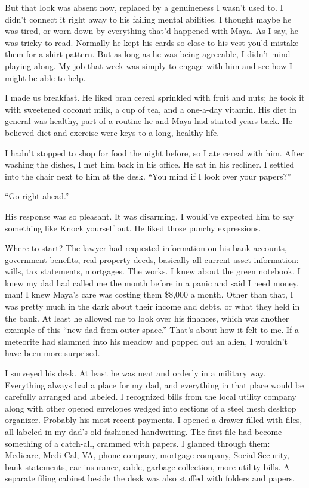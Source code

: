 \documentclass[12pt]{book}
\begin{document}
But that look was absent now, replaced by a genuineness I wasn't used to. I didn't connect it right away to his failing mental abilities. I thought maybe he was tired, or worn down by everything that'd happened with Maya. As I say, he was tricky to read. Normally he kept his cards so close to his vest you'd mistake them for a shirt pattern. But as long as he was being agreeable, I didn't mind playing along. My job that week was simply to engage with him and see how I might be able to help.

I made us breakfast. He liked bran cereal sprinkled with fruit and nuts; he took it with sweetened coconut milk, a cup of tea, and a one-a-day vitamin. His diet in general was healthy, part of a routine he and Maya had started years back. He believed diet and exercise were keys to a long, healthy life.

I hadn't stopped to shop for food the night before, so I ate cereal with him. After washing the dishes, I met him back in his office. He sat in his recliner. I settled into the chair next to him at the desk. ``You mind if I look over your papers?''

``Go right ahead.''

His response was so pleasant. It was disarming. I would've expected him to say something like Knock yourself out. He liked those punchy expressions.

Where to start? The lawyer had requested information on his bank accounts, government benefits, real property deeds, basically all current asset information: wills, tax statements, mortgages. The works. I knew about the green notebook. I knew my dad had called me the month before in a panic and said I need money, man! I knew Maya's care was costing them \$8,000 a month. Other than that, I was pretty much in the dark about their income and debts, or what they held in the bank. At least he allowed me to look over his finances, which was another example of this ``new dad from outer space.'' That's about how it felt to me. If a meteorite had slammed into his meadow and popped out an alien, I wouldn't have been more surprised.

I surveyed his desk. At least he was neat and orderly in a military way. Everything always had a place for my dad, and everything in that place would be carefully arranged and labeled. I recognized bills from the local utility company along with other opened envelopes wedged into sections of a steel mesh desktop organizer. Probably his most recent payments. I opened a drawer filled with files, all labeled in my dad's old-fashioned handwriting. The first file had become something of a catch-all, crammed with papers. I glanced through them: Medicare, Medi-Cal, VA, phone company, mortgage company, Social Security, bank statements, car insurance, cable, garbage collection, more utility bills. A separate filing cabinet beside the desk was also stuffed with folders and papers.
\end{document}
